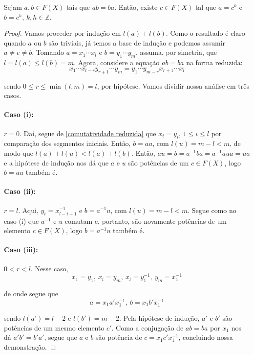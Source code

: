 	\begin{lemma}
		\label{comutatividade em grupos livres}
		Sejam $a,b\in F(X)$ tais que $ab=ba$. Então, existe $c\in F(X)$ tal que $a = c^k$ e $b = c^h$, $k, h\in\mathbb{Z}$.
	\end{lemma}
	\begin{proof}
		Vamos proceder por indução em $l(a) + l(b)$. Como o resultado é claro quando $a$ ou $b$ são triviais, já temos a base de indução e podemos assumir $a\neq e\neq b$. Tomando $a = x_1\cdots x_l$ e $b = y_1\cdots y_m$, assuma, por simetria, que $l = l(a) \leq l(b) = m$. Agora, considere a equação $ab=ba$ na forma reduzida:
		\begin{equation}
		\label{comutatividade reduzida}
		x_1\cdots x_{l-r}y_{r+1}\cdots y_m = y_1\cdots y_{m-r}x_{r+1}\cdots x_l
		\end{equation}
		\par\vspace{0.3cm} sendo $0\leq r\leq\min(l,m) = l$, por hipótese. Vamos dividir nossa análise em três casos.
		\paragraph{Caso (i):} $r=0$. Daí, segue de \eqref{comutatividade reduzida} que $x_i=y_i$, $1\leq i\leq l$ por comparação dos segmentos iniciais. Então, $b = au$, com $l(u) = m-l<m$, de modo que $l(a) + l(u)< l(a) + l(b)$. Então, $au = b = a^{-1}ba = a^{-1}aua = ua$ e a hipótese de indução nos dá que $a$ e $u$ são potências de um $c\in F(X)$, logo $b=au$ também é.
		\paragraph{Caso (ii):} $r = l$. Aqui, $y_i = x_{l-i+1}^{-1}$ e $b = a^{-1}u$, com $l(u) = m-l<m$. Segue como no caso (i) que $a^{-1}$ e $u$ comutam e, portanto, são novamente potências de um elemento $c\in F(X)$, logo $b = a^{-1}u$ também é.
		\paragraph{Caso (iii):} $0 < r < l$. Nesse caso, 
		\begin{equation*}
		x_1 = y_1, \ x_l = y_m, \ x_l = y_1^{-1}, \ y_m = x_1^{-1}
		\end{equation*}
		\par\vspace{0.3cm} de onde segue que
		\begin{equation*}
		a = x_1a'x_1^{-1}, \ b = x_1b'x_1^{-1}
		\end{equation*}
		\par\vspace{0.3cm} sendo $l(a') = l-2$ e $l(b') = m-2$. Pela hipótese de indução, $a'$ e $b'$ são potências de um mesmo elemento $c'$. Como a conjugação de $ab=ba$ por $x_1$ nos dá $a'b' = b'a'$, segue que $a$ e $b$ são potência de $c = x_1c'x_1^{-1}$, concluindo nossa demonstração. 
	\end{proof}
